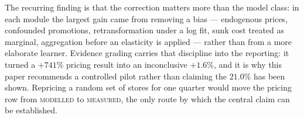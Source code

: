 \documentclass[conference,a4paper]{IEEEtran}
\begin{document}
The recurring finding is that the correction matters more than the model class: in
each module the largest gain came from removing a bias --- endogenous prices,
confounded promotions, retransformation under a log fit, sunk cost treated as
marginal, aggregation before an elasticity is applied --- rather than from a more
elaborate learner. Evidence grading carries that discipline into the reporting: it
turned a $+741\%$ pricing result into an inconclusive $+1.6\%$, and it is why this
paper recommends a controlled pilot rather than claiming the $21.0\%$ has been
shown. Repricing a random set of stores for one quarter would move the pricing row
from \textsc{modelled} to \textsc{measured}, the only route by which the central
claim can be established.

\end{document}
